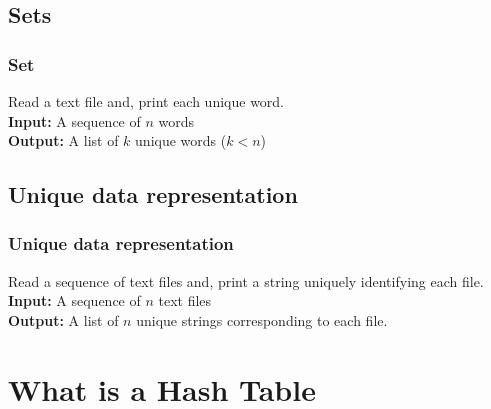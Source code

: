 \documentclass{beamer}
\begin{document}
\subsection{Sets} %

\begin{frame}
\frametitle{Set}
Read a text file and, print each unique word.\\\medskip
    \textbf{Input:} A sequence of $n$ words \\
    \textbf{Output:} A list of $k$ unique words ($k < n$)


\end{frame}



\subsection{Unique data representation} %

\begin{frame}
\frametitle{Unique data representation}
Read a sequence of text files and, print a string uniquely identifying each file.\\\medskip
    \textbf{Input:} A sequence of $n$ text files \\
    \textbf{Output:} A list of $n$ unique strings corresponding to each file.


\end{frame}



\section{What is a Hash Table}
\end{document}
